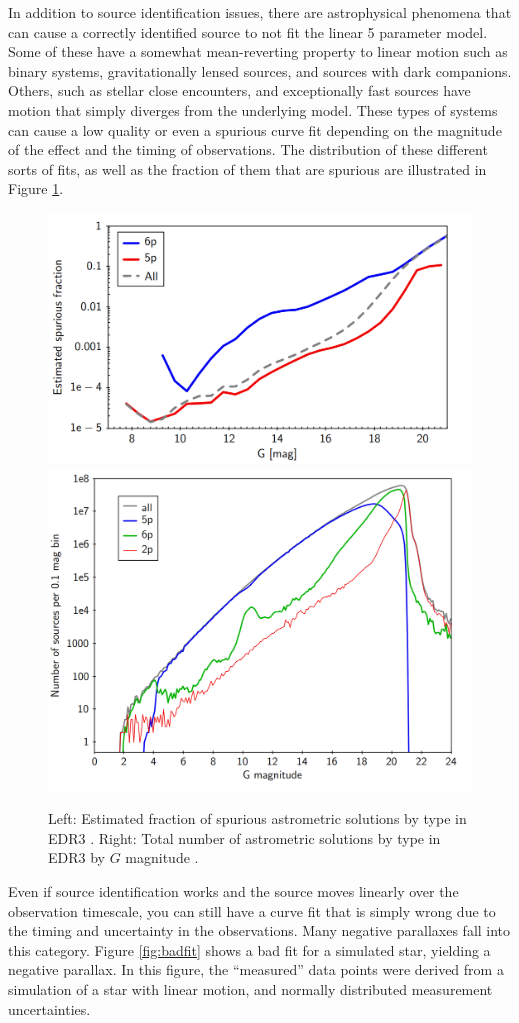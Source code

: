\documentclass[twocolumn]{aastex631}
\begin{document}
In addition to source identification issues, there are astrophysical phenomena that can cause a correctly identified source to not fit the linear 5 parameter model. Some of these have a somewhat mean-reverting property to linear motion such as binary systems, gravitationally lensed sources, and sources with dark companions. Others, such as stellar close encounters, and exceptionally fast sources have motion that simply diverges from the underlying model. These types of systems can cause a low quality or even a spurious curve fit depending on the magnitude of the effect and the timing of observations. The distribution of these different sorts of fits, as well as the fraction of them that are spurious are illustrated in Figure \ref{fig:spuriousfraction}. 
\begin{figure}
	\includegraphics[width=0.56\columnwidth]{spuriousfraction.png}
	\includegraphics[width=0.43\columnwidth]{magdistEDR3.png}

	\caption{Left: Estimated fraction of spurious astrometric solutions by type in EDR3 \citep{fabriciusGaia2021}. Right: Total number of astrometric solutions by type in EDR3 by $G$ magnitude \citep{lindegrenGaia2021a}.}
	\label{fig:spuriousfraction}
\end{figure}

Even if source identification works and the source moves linearly over the observation timescale, you can still have a curve fit that is simply wrong due to the timing and uncertainty in the observations. Many negative parallaxes fall into this category. Figure \ref{fig:badfit} shows a bad fit for a simulated star, yielding a negative parallax. In this figure, the ``measured'' data points were derived from a simulation of a star with linear motion, and normally distributed measurement uncertainties.
\end{document}
